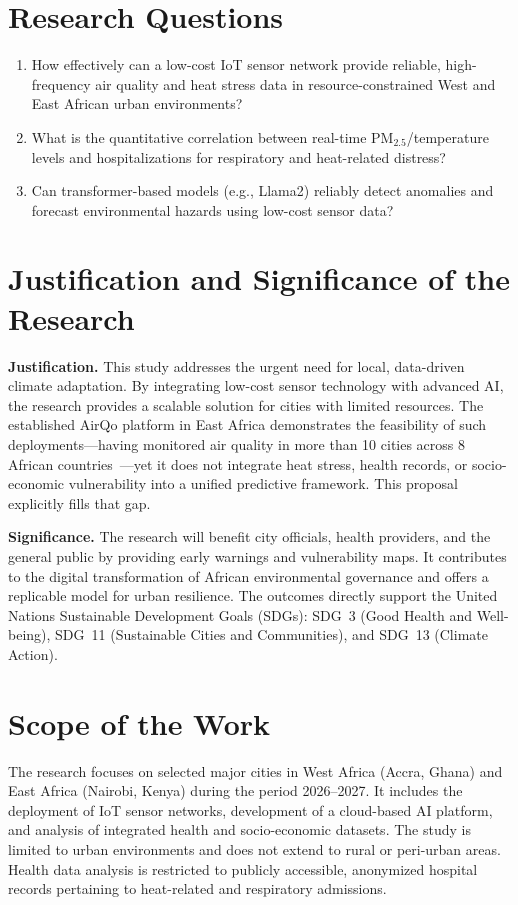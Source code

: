\section{Research Questions}
\begin{enumerate}
  \item How effectively can a low-cost IoT sensor network provide reliable, high-frequency air quality and heat stress data in resource-constrained West and East African urban environments?
  \item What is the quantitative correlation between real-time PM$_{2.5}$/temperature levels and hospitalizations for respiratory and heat-related distress?
  \item Can transformer-based models (e.g., Llama2) reliably detect anomalies and forecast environmental hazards using low-cost sensor data?
\end{enumerate}

\section{Justification and Significance of the Research}
\textbf{Justification.} This study addresses the urgent need for local, data-driven climate adaptation. By integrating low-cost sensor technology with advanced AI, the research provides a scalable solution for cities with limited resources. The established AirQo platform in East Africa demonstrates the feasibility of such deployments—having monitored air quality in more than 10 cities across 8 African countries~\cite{bainomugisha2024}—yet it does not integrate heat stress, health records, or socio-economic vulnerability into a unified predictive framework. This proposal explicitly fills that gap.

\textbf{Significance.} The research will benefit city officials, health providers, and the general public by providing early warnings and vulnerability maps. It contributes to the digital transformation of African environmental governance and offers a replicable model for urban resilience. The outcomes directly support the United Nations Sustainable Development Goals (SDGs): SDG~3 (Good Health and Well-being), SDG~11 (Sustainable Cities and Communities), and SDG~13 (Climate Action).

\section{Scope of the Work}
The research focuses on selected major cities in West Africa (Accra, Ghana) and East Africa (Nairobi, Kenya) during the period 2026--2027. It includes the deployment of IoT sensor networks, development of a cloud-based AI platform, and analysis of integrated health and socio-economic datasets. The study is limited to urban environments and does not extend to rural or peri-urban areas. Health data analysis is restricted to publicly accessible, anonymized hospital records pertaining to heat-related and respiratory admissions.

